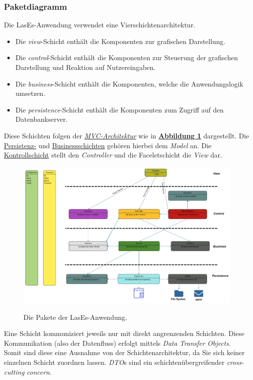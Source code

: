 \subsubsection{Paketdiagramm}

Die LasEs-Anwendung verwendet eine Vierschichtenarchitektur.
\begin{itemize}
    \item Die \emph{view}-Schicht enthält die Komponenten zur grafischen Darstellung.
    \item Die \emph{control}-Schicht enthält die Komponenten zur Steuerung der grafischen Darstellung und Reaktion auf
    Nutzereingaben.
    \item Die \emph{business}-Schicht enthält die Komponenten, welche die Anwendungslogik umsetzen.
    \item Die \emph{persistence}-Schicht enthält die Komponenten zum Zugriff auf den Datenbankserver.
\end{itemize}
Diese Schichten folgen der \emph{\hyperref[arch:mvc]{MVC-Architektur}} wie in
\textbf{\hyperref[feinarch:pakdia]{Abbildung 1}} dargestellt.
Die \hyperref[arch:persistence]{Persistenz-} und
\hyperref[arch:business]{Businessschichten} gehören hierbei
dem \emph{Model} an. Die \hyperref[arch:control]{Kontrollschicht} stellt den \emph{Controller} und die
Faceletschicht die \emph{View} dar.
\begin{figure}[H]
    \centering
    \includegraphics[width=0.8\linewidth]{graphics/Paketdiagramm12.0}\label{feinarch:pakdia}
    \caption{Die Pakete der LasEs-Anwendung.}
\end{figure}

Eine Schicht kommuniziert jeweils nur mit direkt angrenzenden Schichten.
Diese Kommunikation (also der Datenfluss) erfolgt mittels \emph{Data Transfer Objects}.
Somit sind diese eine Ausnahme von der Schichtenarchitektur, da Sie sich keiner
einzelnen Schicht zuordnen lassen.
\emph{DTO}s sind ein schichtenübergreifender \emph{cross-cutting concern}.

